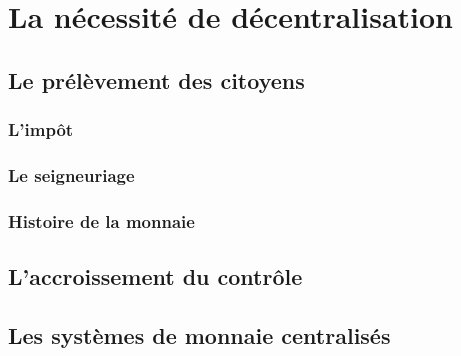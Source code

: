 \chapter{La nécessité de décentralisation}

\section{Le prélèvement des citoyens}

\subsection{L'impôt}

\subsection{Le seigneuriage}

\subsection{Histoire de la monnaie}

\section{L'accroissement du contrôle}

\section{Les systèmes de monnaie centralisés}